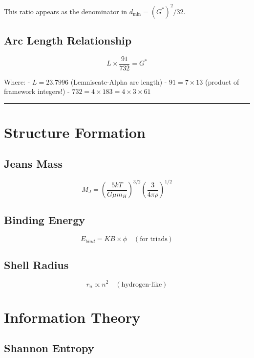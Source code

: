 \documentclass[
  11pt,
  letterpaper,
  twoside,
  openany]{book}
\makeatletter
\let\orig@section\section
\renewcommand{\section}{\needspace{8\baselineskip}\orig@section}
\let\orig@subsection\subsection
\renewcommand{\subsection}{\needspace{6\baselineskip}\orig@subsection}
\makeatother
\begin{document}
This ratio appears as the denominator in \(d_{\min} = (G^*)^2/32\).

\subsection{Arc Length Relationship}\label{arc-length-relationship}

\[
L \times \frac{91}{732} = G^*
\]

Where: - \(L = 23.7996\) (Lemniscate-Alpha arc length) -
\(91 = 7 \times 13\) (product of framework integers!) -
\(732 = 4 \times 183 = 4 \times 3 \times 61\)

\begin{center}\rule{0.5\linewidth}{0.5pt}\end{center}

\section{Structure Formation}\label{structure-formation}

\subsection{Jeans Mass}\label{jeans-mass}

\[
M_J = \left(\frac{5kT}{G\mu m_H}\right)^{3/2} \left(\frac{3}{4\pi\rho}\right)^{1/2}
\]

\subsection{Binding Energy}\label{binding-energy}

\[
E_{bind} = KB \times \phi \quad (\text{for triads})
\]

\subsection{Shell Radius}\label{shell-radius}

\[
r_n \propto n^2 \quad (\text{hydrogen-like})
\]

\section{Information Theory}\label{information-theory}

\subsection{Shannon Entropy}\label{shannon-entropy}
\end{document}
